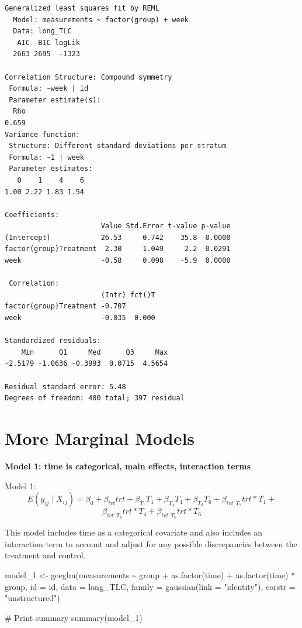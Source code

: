 \documentclass[
  letterpaper,
  DIV=11,
  numbers=noendperiod]{scrreprt}
\newenvironment{Shaded}{\begin{snugshade}}{\end{snugshade}}
\newcommand{\AttributeTok}[1]{\textcolor[rgb]{0.40,0.45,0.13}{#1}}
\newcommand{\CommentTok}[1]{\textcolor[rgb]{0.37,0.37,0.37}{#1}}
\newcommand{\FunctionTok}[1]{\textcolor[rgb]{0.28,0.35,0.67}{#1}}
\newcommand{\NormalTok}[1]{\textcolor[rgb]{0.00,0.23,0.31}{#1}}
\newcommand{\OtherTok}[1]{\textcolor[rgb]{0.00,0.23,0.31}{#1}}
\newcommand{\SpecialCharTok}[1]{\textcolor[rgb]{0.37,0.37,0.37}{#1}}
\newcommand{\StringTok}[1]{\textcolor[rgb]{0.13,0.47,0.30}{#1}}
\begin{document}
\begin{verbatim}
Generalized least squares fit by REML
  Model: measurements ~ factor(group) + week 
  Data: long_TLC 
   AIC  BIC logLik
  2663 2695  -1323

Correlation Structure: Compound symmetry
 Formula: ~week | id 
 Parameter estimate(s):
  Rho 
0.659 
Variance function:
 Structure: Different standard deviations per stratum
 Formula: ~1 | week 
 Parameter estimates:
   0    1    4    6 
1.00 2.22 1.83 1.54 

Coefficients:
                       Value Std.Error t-value p-value
(Intercept)            26.53     0.742    35.8  0.0000
factor(group)Treatment  2.30     1.049     2.2  0.0291
week                   -0.58     0.098    -5.9  0.0000

 Correlation: 
                       (Intr) fct()T
factor(group)Treatment -0.707       
week                   -0.035  0.000

Standardized residuals:
    Min      Q1     Med      Q3     Max 
-2.5179 -1.0636 -0.3993  0.0715  4.5654 

Residual standard error: 5.48 
Degrees of freedom: 400 total; 397 residual
\end{verbatim}

\hypertarget{more-marginal-models}{%
\section{More Marginal Models}\label{more-marginal-models}}

\textbf{Model 1: time is categorical, main effects, interaction terms}

Model 1:
\[E(y_{ij} \mid X_{ij}) = \beta_0 +  \beta_{trt}trt +  \beta_{T_1}T_1 +  \beta_{T_4}T_4 +  \beta_{T_6}T_6 +  \beta_{trt:T_1}trt*T_1+ \]
\[\beta_{trt:T_4}trt*T_4 + \beta_{trt:T_6}trt*T_6\]

This model includes time as a categorical covariate and also includes an
interaction term to account and adjust for any possible discrepancies
between the treatment and control.

\begin{Shaded}
\begin{Highlighting}[]
\NormalTok{model\_1 }\OtherTok{\textless{}{-}} \FunctionTok{geeglm}\NormalTok{(measurements }\SpecialCharTok{\textasciitilde{}}\NormalTok{ group }\SpecialCharTok{+} \FunctionTok{as.factor}\NormalTok{(time) }\SpecialCharTok{+} \FunctionTok{as.factor}\NormalTok{(time) }\SpecialCharTok{*}\NormalTok{ group,}
    \AttributeTok{id =}\NormalTok{ id, }\AttributeTok{data =}\NormalTok{ long\_TLC, }\AttributeTok{family =} \FunctionTok{gaussian}\NormalTok{(}\AttributeTok{link =} \StringTok{"identity"}\NormalTok{), }\AttributeTok{corstr =} \StringTok{"unstructured"}\NormalTok{)}

\CommentTok{\# Print summary}
\FunctionTok{summary}\NormalTok{(model\_1)}
\end{Highlighting}
\end{Shaded}
\end{document}
